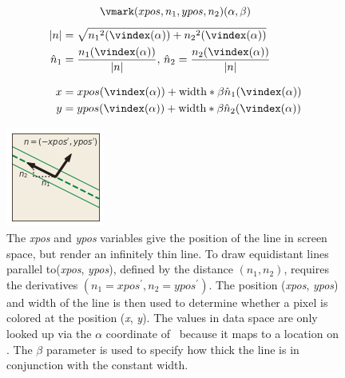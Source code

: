 \documentclass[../main.tex]{subfiles}
\begin{document}
\begin{figure} [H]
    \begin{minipage}{.5\textwidth}
        \begingroup \leqnomode
        \begin{equation}
            \vmark(xpos, n_1, ypos, n_2 )(\alpha, \beta) 
            \label{eq:eq:math:artist:q:line}
        \end{equation} \endgroup
        \begin{align*}
            \lvert n \rvert &=\sqrt{{n_{1}}^2(\vindex(\alpha)) + {n_{2}}^2(\vindex(\alpha))} \\
            \hat{n}_{1} &= \frac{n_1(\vindex(\alpha))}{\lvert n \rvert}, \,\hat{n}_{2} = \frac{n_2(\vindex(\alpha))}{\lvert n \rvert} \\[.5\baselineskip]
            x &= xpos(\vindex(\alpha)) + \text{width}*\beta\hat{n}_1(\vindex(\alpha))  \\
            y &= ypos(\vindex(\alpha)) + \text{width}*\beta\hat{n}_2(\vindex(\alpha)) 
           \end{align*}
    \end{minipage}
    \begin{minipage}{.5\textwidth}
        \centering
        \includegraphics{figures/math/line_s.png}
    \end{minipage}
    \caption{The \textit{xpos} and \textit{ypos} variables give the position of the line in screen space, but render an infinitely thin line. To draw equidistant lines parallel to(\textit{xpos}, \textit{ypos}), defined by the distance  $(n_1, n_2)$, requires the derivatives $(n_{1} = xpos^{\prime}, n_{2} = ypos^{\prime})$. The position (\textit{xpos}, \textit{ypos}) and width of the line is then used to determine whether a pixel is colored at the position (\textit{x}, \textit{y}). The values in data space are only looked up via the $\alpha$ coordinate of \gbase\ because it maps to a location on \dbase. The $\beta$ parameter is used to specify how thick the line is in conjunction with the constant width. }
    \label{fig:math:artist:q:line:s}
\end{figure}
\end{document}
